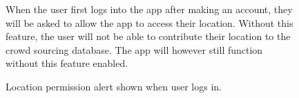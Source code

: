 \begin{figure}
    \centering
    \begin{minipage}{.5\textwidth}
      \centering
      \caption{Location permission alert shown when user logs in.}
      \label{fig:result_permission}
    \end{minipage}%
    \begin{minipage}{.5\textwidth}
        When the user first logs into the app after making an account, they will be asked to allow the app to access their location. Without this feature, the user will not be able to contribute their location to the crowd sourcing database. The app will however still function without this feature enabled.
    \end{minipage}
\end{figure}

